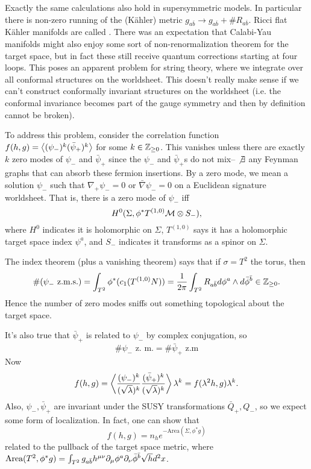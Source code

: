 Exactly the same calculations also hold in supersymmetric models. In particular there is non-zero running of the (K\"ahler) metric $g_{a\bar b}\to g_{a\bar b} + \# R_{a\bar b}$. Ricci flat K\"ahler manifolds are called . There was an expectation that Calabi-Yau manifolds might also enjoy some sort of non-renormalization theorem for the target space, but in fact these still receive quantum corrections starting at four loops. This poses an apparent problem for string theory, where we integrate over all conformal structures on the worldsheet. This doesn't really make sense if we can't construct conformally invariant structures on the worldsheet (i.e. the conformal invariance becomes part of the gauge symmetry and then by definition cannot be broken).

To address this problem, consider the correlation function $f(h,g)=\left< (\psi_-)^k (\bar \psi_+)^k \right>$ for some $k\in \mathbb{Z}_{\geq 0}$. This vanishes unless there are exactly $k$ zero modes of $\psi_-$ and $\bar \psi_+$ since the $\psi_-$ and $\bar \psi_+$s do not mix-- $\not \exists$ any Feynman graphs that can absorb these fermion insertions. By a zero mode, we mean a solution $\psi_-$ such that $\nabla_+\psi_-=0$ or $\bar \nabla \psi_-=0$ on a Euclidean signature worldsheet. That is, there is a zero mode of $\psi_-$ iff
\begin{equation}
    H^0(\Sigma, \phi^* T^{(1,0)} \mathcal{M} \otimes S_-),
\end{equation}
where $H^0$ indicates it is holomorphic on $\Sigma$, $T^{(1,0)}$ says it has a holomorphic target space index $\psi^a$, and $S_-$ indicates it transforms as a spinor on $\Sigma$.

The index theorem (plus a vanishing theorem) says that if $\sigma =T^2$ the torus, then
\begin{equation}
    \#(\psi_-\text{ z.m.s.}) = \int_{T^2} \phi^*(c_1(T^{(1,0)}N)) = \frac{1}{2\pi} \int_{T^2} R_{a\bar b} d\phi^a \wedge d\bar \phi^{\bar b} \in \mathbb{Z}_{\geq 0}.
\end{equation}
Hence the number of zero modes sniffs out something topological about the target space.

It's also true that $\bar \psi_+$ is related to $\psi_-$ by complex conjugation, so
\begin{equation}
     \#\psi_- \text{ z. m.} =\# \bar \psi_+ \text{ z.m}
\end{equation}
Now
\begin{equation}
    f(h,g)=\left< \frac{(\psi_-)^k}{(\sqrt{\lambda})^k}\frac{(\bar \psi_+)^k}{(\sqrt{\lambda})^k} \right> \lambda^k = f(\lambda^2 h, g) \lambda^k.
\end{equation}
Also, $\psi_-,\bar \psi_+$ are invariant under the SUSY transformations $\bar Q_+,Q_-$, so we expect some form of localization. In fact, one can show that
\begin{equation}
    f(h,g) = n_h e^{-\text{Area}(\Sigma,\phi^*g)}
\end{equation}
related to the pullback of the target space metric, where $\text{Area}(T^2, \phi^*g) =\int_{T^2} g_{a\bar b} h^{\mu\nu} \partial_\mu \phi^a \partial_\nu \bar \phi^{\bar b} \sqrt{h} d^2 x$.

